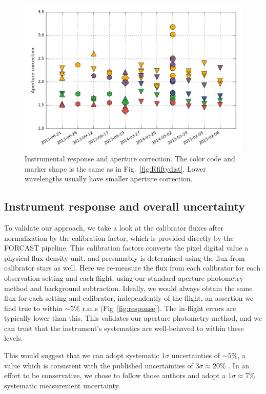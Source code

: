 \begin{figure}[!h]
\begin{center}
\includegraphics[width=\textwidth]{Figures/Aper_corr.png}
\vspace{-0.5cm}
\caption[aperture correction]{Instrumental response and aperture correction. The color code and marker shape is the same as in Fig.~\ref{fig:Rfiftydist}. Lower wavelengths usually have smaller aperture correction.}
\label{fig:apercorr}
\end{center}
\end{figure}

\subsection{Instrument response and overall uncertainty}
To validate our approach, we take a look at the calibrator fluxes after normalization by the calibration factor, which is provided directly by the FORCAST pipeline. This calibration factors converts the pixel digital value a physical flux density unit, and presumably is determined using the flux from calibrator stars as well. Here we re-measure the flux from each calibrator for each observation setting and each flight, using our standard aperture photometry method and background subtraction. Ideally, we would always obtain the same flux for each setting and calibrator, independently of the flight, an assertion we find true to within $\sim 5\%$ r.m.s (Fig~\ref{fig:response}). The in-flight errors are typically lower than this. This validates our aperture photometry method, and we can trust that the instrument's systematics are well-behaved to within these levels. 

This would suggest that we can adopt systematic $1\sigma$ uncertainties of $\sim 5\%$, a value which is consistent with the published uncertainties of $3\sigma \approx 20\%$ \citep{DeBuizer:2012ie}. In an effort to be conservative, we chose to follow those authors and adopt a $1\sigma\approx 7\%$ systematic measurement uncertainty.


